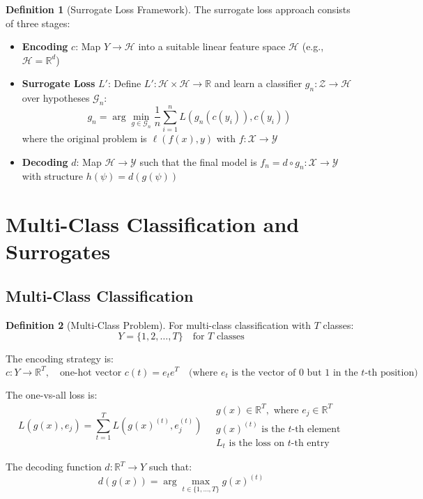 \documentclass[12pt,a4paper]{article}
\theoremstyle{definition}
\newtheorem{definition}{Definition}[section]
\begin{document}
\begin{definition}[Surrogate Loss Framework]
The surrogate loss approach consists of three stages:

\begin{itemize}
    \item \textbf{Encoding } $c$: Map $Y \to \mathcal{H}$ into a suitable linear feature space $\mathcal{H}$ (e.g., $\mathcal{H} = \mathbb{R}^d$)
    
    \item \textbf{Surrogate Loss } $L'$: Define $L': \mathcal{H} \times \mathcal{H} \to \mathbb{R}$ and learn a classifier $g_n: \mathcal{Z} \to \mathcal{H}$ over hypotheses $\mathcal{G}_n$:
    \[
    g_n = \arg\min_{g \in \mathcal{G}_n} \frac{1}{n}\sum_{i=1}^n L(g_n(c(y_i)), c(y_i))
    \]
    where the original problem is $\ell(f(x), y)$ with $f: \mathcal{X} \to \mathcal{Y}$
    
    \item \textbf{Decoding } $d$: Map $\mathcal{H} \to \mathcal{Y}$ such that the final model is $f_n = d \circ g_n: \mathcal{X} \to \mathcal{Y}$ with structure $h(\psi) = d(g(\psi))$
\end{itemize}
\end{definition}

\newpage


\section{Multi-Class Classification and Surrogates}

\subsection{Multi-Class Classification}

\begin{definition}[Multi-Class Problem]
For multi-class classification with $T$ classes:
\[
Y = \{1, 2, \ldots, T\} \quad \text{for } T \text{ classes}
\]

The encoding strategy is:
\[
c : Y \to \mathbb{R}^T, \quad \text{one-hot vector } c(t) = e_t e^T \quad \text{(where } e_t \text{ is the vector of 0 but 1 in the } t\text{-th position)}
\]

The one-vs-all loss is:
\[
L(g(x), e_j) = \sum_{t=1}^T L(g(x)^{(t)}, e_j^{(t)}) \quad \begin{array}{l} g(x) \in \mathbb{R}^T, \text{ where } e_j \in \mathbb{R}^T \\ g(x)^{(t)} \text{ is the } t\text{-th element} \\ L_t \text{ is the loss on } t\text{-th entry} \end{array}
\]

The decoding function $d: \mathbb{R}^T \to Y$ such that:
\[
d(g(x)) = \arg\max_{t \in \{1,\ldots,T\}} g(x)^{(t)}
\]
\end{definition}
\end{document}
